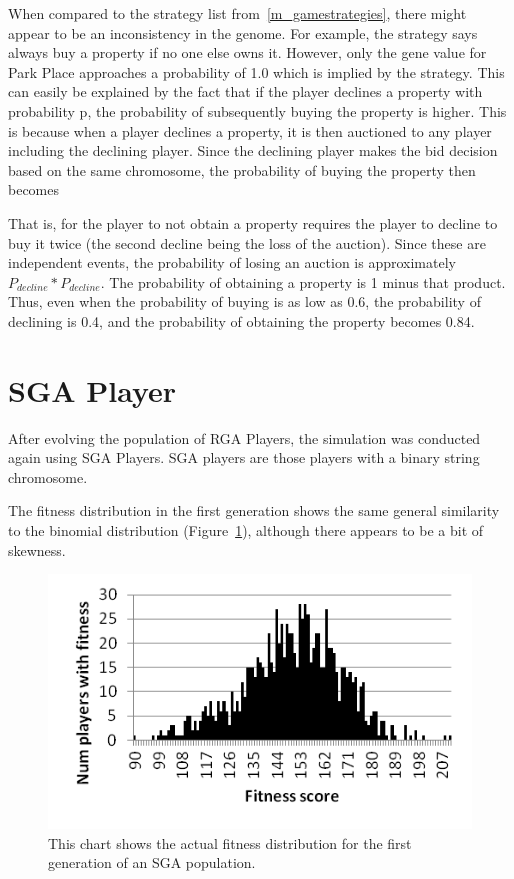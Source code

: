 When compared to the strategy list from~\ref{m_gamestrategies}, there might
appear to be an inconsistency in the genome. For example, the strategy says
always buy a property if no one else owns it. However, only the gene value for
Park Place approaches a probability of 1.0 which is implied by the strategy.
This can easily be explained by the fact that if the player declines a property
with probability p, the probability of subsequently buying the property is
higher. This is because when a player declines a property, it is then auctioned
to any player including the declining player. Since the declining player makes
the bid decision based on the same chromosome, the probability of buying the
property then becomes

That is, for the player to not obtain a property requires the player to decline
to buy it twice (the second decline being the loss of the auction). Since these
are independent events, the probability of losing an auction is approximately
\(P_{decline} * P_{decline}\). The probability of obtaining a property is 1
minus that product. Thus, even when the probability of buying is as low as 0.6,
the probability of declining is 0.4, and the probability of obtaining the
property becomes 0.84.

\section{SGA Player} \label{6_SGA}

After evolving the population of RGA Players, the simulation was conducted again
using SGA Players. SGA players are those players with a binary string
chromosome.

The fitness distribution in the first generation shows the same general
similarity to the binomial distribution (Figure~\ref{figure-sga_gen0}), although
there appears to be a bit of skewness.

\begin{figure}[htp]
\centerline{\includegraphics[width=0.75\columnwidth]{Figures/sga_gen0.png}}
\caption[SGA Fitness Generation 0]{This chart shows the actual fitness
distribution for the first generation of an SGA population.}
\label{figure-sga_gen0}
\end{figure}

